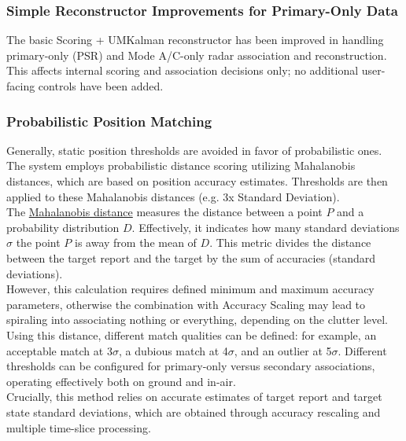 \subsubsection{Simple Reconstructor Improvements for Primary-Only Data}

The basic Scoring + UMKalman reconstructor has been improved in handling primary-only (PSR) and Mode A/C-only radar association and reconstruction. This affects internal scoring and association decisions only; no additional user-facing controls have been added. \\

\subsubsection{Probabilistic Position Matching}

Generally, static position thresholds are avoided in favor of probabilistic ones. The system employs probabilistic distance scoring utilizing Mahalanobis distances, which are based on position accuracy estimates. Thresholds are then applied to these Mahalanobis distances (e.g. 3x Standard Deviation).\\

The \href{https://en.wikipedia.org/wiki/Mahalanobis_distance}{Mahalanobis distance} measures the distance between a point $P$ and a probability distribution $D$. Effectively, it indicates how many standard deviations $\sigma$ the point $P$ is away from the mean of $D$. This metric divides the distance between the target report and the target by the sum of accuracies (standard deviations). \\

However, this calculation requires defined minimum and maximum accuracy parameters, otherwise the combination with Accuracy Scaling may lead to spiraling into associating nothing or everything, depending on the clutter level.\\

Using this distance, different match qualities can be defined: for example, an acceptable match at 3$\sigma$, a dubious match at 4$\sigma$, and an outlier at 5$\sigma$. Different thresholds can be configured for primary-only versus secondary associations, operating effectively both on ground and in-air.\\

Crucially, this method relies on accurate estimates of target report and target state standard deviations, which are obtained through accuracy rescaling and multiple time-slice processing.


